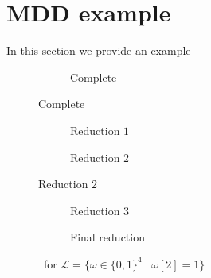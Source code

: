 \section{MDD example}
\label{sec:mdd_example}
In this section we provide an example

\begin{figure}[!htb]
	\centering
	\begin{subfigure}[b]{0.95\linewidth}
		\centering
		
		\caption{Complete \mdd}
		\label{fig:mmd1}
	\end{subfigure}
\end{figure}

\begin{figure}[!htb]\ContinuedFloat
	\begin{subfigure}[b]{.45\linewidth}
		\centering
		
		\caption{Reduction $1$}
		\label{fig:mmd2}
	\end{subfigure}
	\hfill
	\begin{subfigure}[b]{.45\linewidth}
		\centering
		
		\caption{Reduction $2$}
		\label{fig:mmd3}
	\end{subfigure}
\end{figure}

\begin{figure}[!htb]\ContinuedFloat
	\begin{subfigure}[b]{.45\linewidth}
		\centering
		
		\caption{Reduction $3$}
		\label{fig:mmd4}
	\end{subfigure}
	\hfill
	\begin{subfigure}[b]{.45\linewidth}
		\centering
		
		\caption{Final reduction}
		\label{fig:mmd5}
	\end{subfigure}

	\caption{\mdd\ for $\mathcal{L} = \{\omega \in \{0, 1\}^4 \mid \omega[2] = 1\}$}
	\label{fig:mmd}
\end{figure}